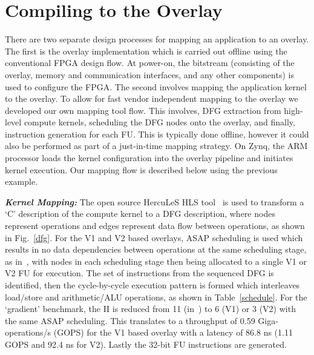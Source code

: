 \section{Compiling to the Overlay}
\label{ch4_tool}
There are two separate design processes for mapping an application to an overlay. The first is the overlay implementation which is carried out offline using the conventional FPGA design flow. 
At power-on, the bitstream (consisting of the overlay, memory and communication interfaces, and any other components) is used to configure the FPGA.
The second involves mapping the application kernel to the overlay.
To allow for fast vendor independent mapping to the overlay we developed our own mapping tool flow.
This involves, DFG extraction from high-level compute kernels, scheduling the DFG nodes onto the overlay, and finally, instruction generation for each FU. This is typically done offline, however it could also be performed as part of a just-in-time mapping strategy.
On Zynq, the ARM processor loads the kernel configuration into the overlay pipeline and initiates kernel execution.
Our mapping flow is described below using the previous example.

\textbf{\textit{Kernel Mapping:}} The open source HercuLeS HLS tool~\cite{kavvadias2013hardware} is used to transform a `C' description of the compute kernel to a DFG description, where nodes represent operations and edges represent data flow between operations, as shown in Fig.~\ref{dfg}.
For the V1 and V2 based overlays, ASAP scheduling is used which results in no data dependencies between operations at the same scheduling stage, as in~\cite{li2016area}, with nodes in each scheduling stage then being allocated to a single V1 or V2 FU for execution. 
The set of instructions from the sequenced DFG is identified, then the cycle-by-cycle execution pattern is formed which interleaves load/store and arithmetic/ALU operations, as shown in Table~\ref{schedule}. 
For the `gradient' benchmark, the II is reduced from 11 (in~\cite{li2016area}) to 6 (V1) or 3 (V2) with the same ASAP scheduling.
This translates to a throughput of 0.59 Giga-operations/s (GOPS) for the V1 based overlay with a latency of 86.8 ns (1.11 GOPS and 92.4 ns for V2). 
Lastly the 32-bit FU instructions are generated.

